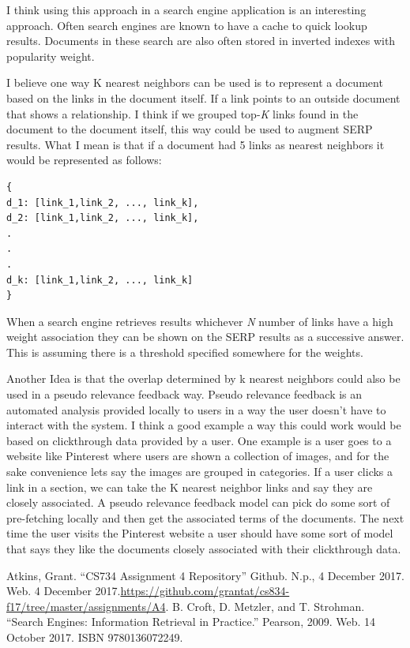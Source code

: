 \documentclass[letterpaper,11pt]{article}
\begin{document}
I think using this approach in a search engine application is an interesting approach.
Often search engines are known to have a cache to quick lookup results.
Documents in these search are also often stored in inverted indexes with popularity weight.

I believe one way K nearest neighbors can be used is to represent a document based on the links in the document itself.
If a link points to an outside document that shows a relationship.
I think if we grouped top-\textit{K} links found in the document to the document itself, this way could be used to augment SERP results.
What I mean is that if a document had 5 links as nearest neighbors it would be represented as follows:

\begin{verbatim}
{
d_1: [link_1,link_2, ..., link_k],
d_2: [link_1,link_2, ..., link_k],
.
.
.
d_k: [link_1,link_2, ..., link_k]
}
\end{verbatim}

When a search engine retrieves results whichever \textit{N} number of links have a high weight association they can be shown on the SERP results as a successive answer.
This is assuming there is a threshold specified somewhere for the weights.

Another Idea is that the overlap determined by k nearest neighbors could also be used in a pseudo relevance feedback way.
Pseudo relevance feedback is an automated analysis provided locally to users in a way the user doesn't have to interact with the system.
I think a good example a way this could work would be based on clickthrough data provided by a user.
One example is a user goes to a website like Pinterest where users are shown a collection of images, and for the sake convenience lets say the images are grouped in categories.
If a user clicks a link in a section, we can take the K nearest neighbor links and say they are closely associated.
A pseudo relevance feedback model can pick do some sort of pre-fetching locally and then get the associated terms of the documents.
The next time the user visits the Pinterest website a user should have some sort of model that says they like the documents closely associated with their clickthrough data.


\clearpage


\clearpage



\begin{thebibliography}{9}
Atkins, Grant. ``CS734 Assignment 4 Repository'' Github. N.p., 4 December 2017. Web. 4 December 2017.\url{https://github.com/grantat/cs834-f17/tree/master/assignments/A4}.
B. Croft, D. Metzler, and T. Strohman. ``Search Engines: Information Retrieval in Practice.'' Pearson, 2009. Web. 14 October 2017. ISBN 9780136072249.
\end{thebibliography}
\end{document}
